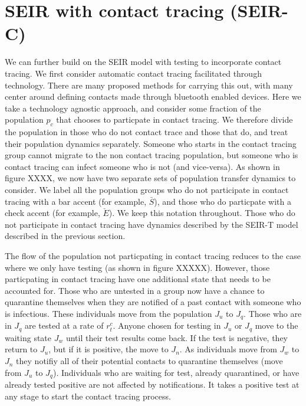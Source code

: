 \documentclass[notitlepage, superscriptaddress]{revtex4-2}
\begin{document}
\section{SEIR with contact tracing (SEIR-C)}
We can further build on the SEIR model with testing to incorporate contact tracing. We first consider automatic contact tracing facilitated through technology. There are many proposed methods for carrying this out, with many center around defining contacts made through bluetooth enabled devices. Here we take a technology agnostic approach, and consider some fraction of the population $p_{c}$ that chooses to particpate in contact tracing. We therefore divide the population in those who do not contact trace and those that do, and treat their population dynamics separately. Someone who starts in the contact tracing group cannot migrate to the non contact tracing population, but someone who is contact tracing can infect someone who is not (and vice-versa). As shown in figure XXXX, we now have two separate sets of population transfer dynamics to consider. We label all the population groups who do not participate in contact tracing with a bar accent (for example, $\bar{S}$), and those who do particpate with a check accent (for example, $\check{E}$). We keep this notation throughout. Those who do not participate in contact tracing have dynamics described by the SEIR-T model described in the previous section.

The flow of the population not particpating in contact tracing reduces to the case where we only have testing (as shown in figure XXXXX). However, those particpating in contact tracing have one additional state that needs to be accounted for. Those who are untested in a group now have a chance to quarantine themselves when they are notified of a past contact with someone who is infectious. These individuals move from the population $J_{u}$ to $J_{q}$. Those who are in $J_{q}$ are tested at a rate of $r^{c}_{t}$. Anyone chosen for testing in $J_{u}$ or $J_{q}$ move to the waiting state $J_{w}$ until their test results come back. If the test is negative, they return to $J_{u}$, but if it is positive, the move to $J_{n}$. As individuals move from $J_{w}$ to $J_{n}$ they notifiy all of their potential contacts to quarantine themselves (move from $J_{u}$ to $J_{q}$). Individuals who are waiting for test, already quarantined, or have already tested positive are not affected by notifications. It takes a positive test at any stage to start the contact tracing process.
\end{document}
